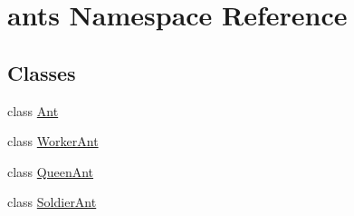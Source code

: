 \hypertarget{namespaceants}{\section{ants Namespace Reference}
\label{namespaceants}
}
\subsection*{Classes}
\begin{DoxyCompactItemize}
\item 
class \hyperlink{classants_1_1Ant}{Ant}
\item 
class \hyperlink{classants_1_1WorkerAnt}{Worker\+Ant}
\item 
class \hyperlink{classants_1_1QueenAnt}{Queen\+Ant}
\item 
class \hyperlink{classants_1_1SoldierAnt}{Soldier\+Ant}
\end{DoxyCompactItemize}
